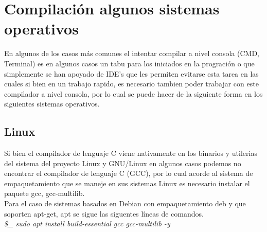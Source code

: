 \documentclass[10pt,executivepaper]{article}
\newcommand\tab[1][1cm]{\hspace*{#1}}
\begin{document}
\begin{center}
	\par{}
\par{}
\par{}
\par\vspace{2cm}{
	Ultima fecha modificado: \today
}
\end{center}

\clearpage
\tableofcontents
\clearpage

\section{Compilación algunos sistemas operativos}
En algunos de los casos más comunes el intentar compilar a nivel consola (CMD, Terminal) es en algunos casos un tabu para los iniciados en la progración o que simplemente se han apoyado de IDE's que les permiten evitarse esta tarea en las cuales si bien en un trabajo rapido, es necesario tambien poder trabajar con este compilador a nivel consola, por lo cual se puede hacer de la siguiente forma en los siguientes sistemas operativos.
\subsection{Linux}
Si bien el compilador de lenguaje C viene nativamente en los binarios y utilerias del sistema del proyecto Linux y GNU/Linux en algunos casos podemos no encontrar el compilador de lenguaje C (GCC), por lo cual acorde al sistema de empaquetamiento que se maneje en sus sistemas Linux es necesario instalar el paquete gcc, gcc-multilib.\\
Para el caso de sistemas basados en Debian con empaquetamiento deb y que soporten apt-get, apt se sigue las siguentes líneas de comandos.\\
\tab \textit{\$\_ sudo apt install build-essential gcc gcc-multilib -y}
\end{document}
